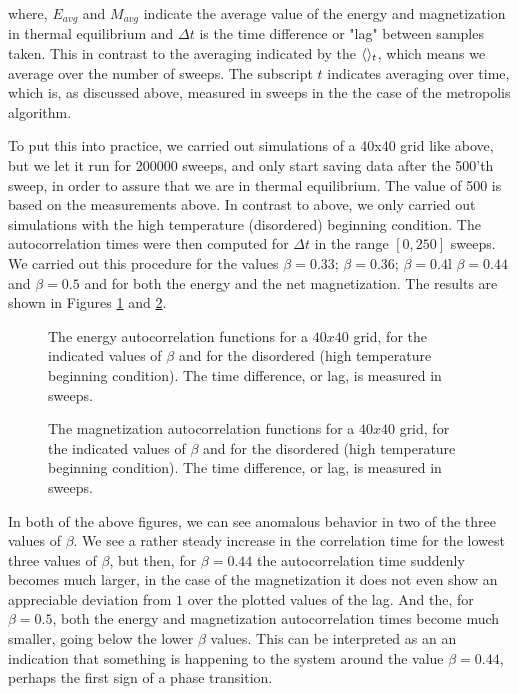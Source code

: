 \documentclass[11pt,a4paper]{article}
\DeclarePairedDelimiter{\avg}{\langle}{\rangle}
\begin{document}
where, $E_{avg}$ and $M_{avg}$ indicate the average value of the energy and magnetization in thermal equilibrium and $\Delta t$
 is the time difference or "lag" between samples taken.
 This in contrast to the averaging indicated by the $\avg{}_t$, which means we average over the number of
 sweeps. The subscript $t$ indicates averaging over time, which is, as discussed above, measured in sweeps in the
 the case of the metropolis algorithm. 

To put this into practice, we carried out simulations of a 40x40 grid like above, but we let it run for 200000 sweeps, and only 
 start saving data after the 500'th sweep, in order to assure that we are in thermal equilibrium. The value of 500 is based on the
 measurements above. In contrast to above, we only carried out simulations with the high temperature (disordered) beginning condition. 
 The autocorrelation times were then computed for $\Delta t$ in the range $[0,250]$ sweeps. We carried out this procedure for the values
 $\beta = 0.33$; $\beta = 0.36$; $\beta = 0.4$l $\beta = 0.44$ and $\beta = 0.5$ and for both the energy and the net magnetization. The 
 results are shown in Figures \ref{fig:ac_energy} and \ref{fig:ac_mag}. 

\begin{figure}[h!]

  \caption{The energy autocorrelation functions for a $40x40$ grid, for the indicated values of $\beta$ and for the disordered (high 
    temperature beginning condition). The time difference, or lag, is measured in sweeps.}

\label{fig:ac_energy}
\end{figure}


\begin{figure}[h!]

  \caption{The magnetization autocorrelation functions for a $40x40$ grid, for the indicated values of $\beta$ and for the disordered (high 
    temperature beginning condition). The time difference, or lag, is measured in sweeps.}

\label{fig:ac_mag}
\end{figure}

In both of the above figures, we can see anomalous behavior in two of the three values of $\beta$. We see a rather steady increase
 in the correlation time for the lowest three values of $\beta$, but then, for $\beta = 0.44$ the autocorrelation time suddenly
 becomes much larger, in the case of the magnetization it does not even show an appreciable deviation from $1$ over the plotted 
 values of the lag. And the, for $\beta = 0.5$, both the energy and magnetization autocorrelation times become much smaller, going
 below the lower $\beta$ values. This can be interpreted as an an indication that something is happening to the system around the 
 value $\beta = 0.44$, perhaps the first sign of a phase transition. 
\end{document}
